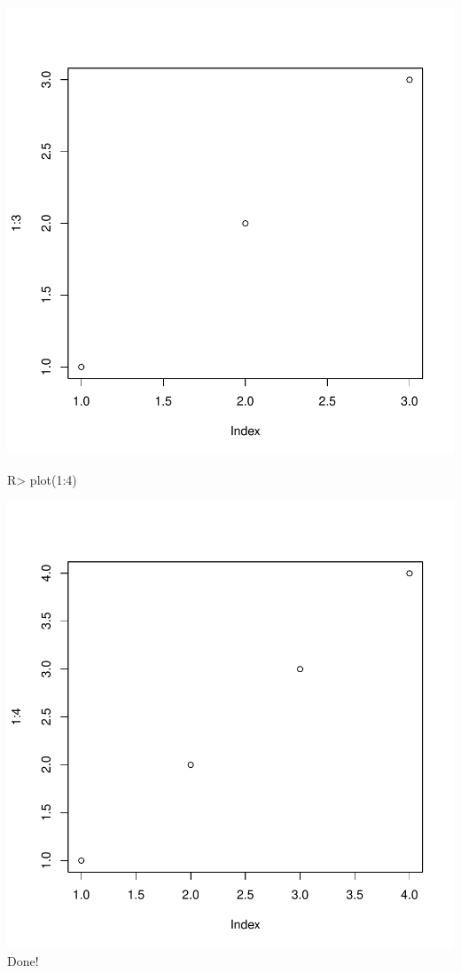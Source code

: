 \includegraphics{customgraphics-003}
\begin{Schunk}
\begin{Sinput}
R> plot(1:4)
\end{Sinput}
\end{Schunk}
\includegraphics{customgraphics-004}
Done!

